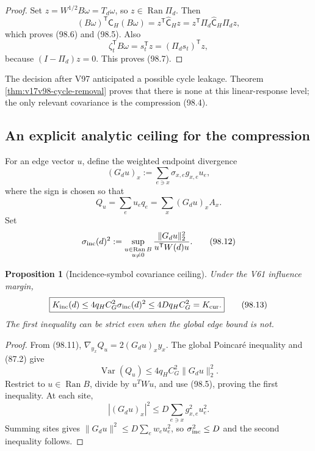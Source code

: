 \documentclass[11pt]{article}
\newtheorem{proposition}[theorem]{Proposition}
\theoremstyle{remark}
\begin{document}
\begin{proof}
Set \(z=W^{1/2}B\omega=T_d\omega\), so
\(z\in\operatorname{Ran}\Pi_d\).  Then
\[
 (B\omega)^{\mathsf T}\mathsf C_H(B\omega)
 =z^{\mathsf T}\widehat{\mathsf C}_Hz
 =z^{\mathsf T}\Pi_d\widehat{\mathsf C}_H\Pi_dz,  \tag{98.8}
\]
which proves (98.6) and (98.5).  Also
\[
 \zeta_t^{\mathsf T}B\omega=s_t^{\mathsf T}z
 =(\Pi_ds_t)^{\mathsf T}z,                      \tag{98.9}
\]
because \((I-\Pi_d)z=0\).  This proves (98.7).
\end{proof}

The decision after V97 anticipated a possible cycle leakage.  Theorem
\ref{thm:v17v98-cycle-removal} proves that there is none at this
linear-response level; the only relevant covariance is the compression
(98.4).

\subsection{An explicit analytic ceiling for the compression}

For an edge vector \(u\), define the weighted endpoint divergence
\[
 (G_du)_x
 :=\sum_{e\ni x}\sigma_{x,e}g_{x,e}u_e,            \tag{98.10}
\]
where the sign is chosen so that
\[
 Q_u=\sum_eu_eq_e=\sum_x(G_du)_xA_x.                \tag{98.11}
\]
Set
\[
 \sigma_{\rm inc}(d)^2
 :=\sup_{\substack{u\in\operatorname{Ran}B\\u\ne0}}
 \frac{\|G_du\|_2^2}{u^{\mathsf T}W(d)u}.           \tag{98.12}
\]

\begin{proposition}[Incidence-symbol covariance ceiling]
\label{prop:v17v98-ceiling}
Under the V61 influence margin,
\[
\boxed{
 K_{\rm inc}(d)
 \leq4q_HC_G^2\sigma_{\rm inc}(d)^2
 \leq4Dq_HC_G^2=K_{\rm cur}.}                      \tag{98.13}
\]
The first inequality can be strict even when the global edge bound is
not.
\end{proposition}

\begin{proof}
From (98.11),
\(\nabla_{y_x}Q_u=2(G_du)_xy_x\).  The global Poincar\'e inequality
and (87.2) give
\[
 \operatorname{Var}(Q_u)
 \leq4q_HC_G^2\|G_du\|_2^2.                         \tag{98.14}
\]
Restrict to \(u\in\operatorname{Ran}B\), divide by \(u^TWu\), and
use (98.5), proving the first inequality.  At each site,
\[
 |(G_du)_x|^2
 \leq D\sum_{e\ni x}g_{x,e}^2u_e^2.                \tag{98.15}
\]
Summing sites gives
\(\|G_du\|^2\leq D\sum_ew_eu_e^2\), so
\(\sigma_{\rm inc}^2\leq D\) and the second inequality follows.
\end{proof}
\end{document}
